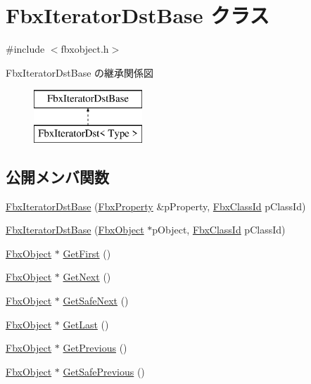 \hypertarget{class_fbx_iterator_dst_base}{}\section{Fbx\+Iterator\+Dst\+Base クラス}
\label{class_fbx_iterator_dst_base}


{\ttfamily \#include $<$fbxobject.\+h$>$}

Fbx\+Iterator\+Dst\+Base の継承関係図\begin{figure}[H]
\begin{center}
\leavevmode
\includegraphics[height=2.000000cm]{class_fbx_iterator_dst_base}
\end{center}
\end{figure}
\subsection*{公開メンバ関数}
\begin{DoxyCompactItemize}
\item 
\hyperlink{class_fbx_iterator_dst_base_ab8ebd364825476724f9db0ca76bf6f9b}{Fbx\+Iterator\+Dst\+Base} (\hyperlink{class_fbx_property}{Fbx\+Property} \&p\+Property, \hyperlink{class_fbx_class_id}{Fbx\+Class\+Id} p\+Class\+Id)
\item 
\hyperlink{class_fbx_iterator_dst_base_a28644eed9f037cf94d81dbf7c733622e}{Fbx\+Iterator\+Dst\+Base} (\hyperlink{class_fbx_object}{Fbx\+Object} $\ast$p\+Object, \hyperlink{class_fbx_class_id}{Fbx\+Class\+Id} p\+Class\+Id)
\item 
\hyperlink{class_fbx_object}{Fbx\+Object} $\ast$ \hyperlink{class_fbx_iterator_dst_base_a52413f0e25a78503bbd1add8a30fec80}{Get\+First} ()
\item 
\hyperlink{class_fbx_object}{Fbx\+Object} $\ast$ \hyperlink{class_fbx_iterator_dst_base_ae7b2570f972d09f8e12b2dc22033c90e}{Get\+Next} ()
\item 
\hyperlink{class_fbx_object}{Fbx\+Object} $\ast$ \hyperlink{class_fbx_iterator_dst_base_a2107573dd3869f094ca35931ffc4b790}{Get\+Safe\+Next} ()
\item 
\hyperlink{class_fbx_object}{Fbx\+Object} $\ast$ \hyperlink{class_fbx_iterator_dst_base_a36f14606800603afb3106369d8dec485}{Get\+Last} ()
\item 
\hyperlink{class_fbx_object}{Fbx\+Object} $\ast$ \hyperlink{class_fbx_iterator_dst_base_aa722d332048283c09ba3e690bfe52e14}{Get\+Previous} ()
\item 
\hyperlink{class_fbx_object}{Fbx\+Object} $\ast$ \hyperlink{class_fbx_iterator_dst_base_af5526eefa90ef43e1a0daff1b8e8e3d3}{Get\+Safe\+Previous} ()
\end{DoxyCompactItemize}
